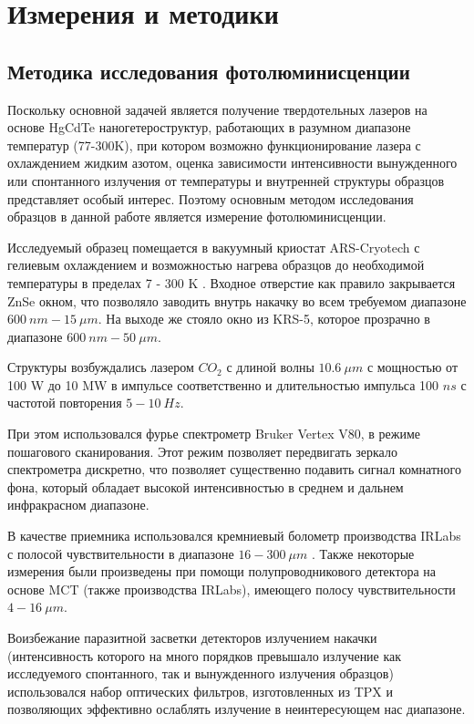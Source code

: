 \documentclass[../main.tex]{subfiles}
\begin{document}
    \chapter{Измерения и методики}

    
    \section{Методика исследования фотолюминисценции}
   
    Поскольку основной задачей является получение твердотельных лазеров 
    на основе HgCdTe наногетероструктур, работающих в разумном диапазоне температур (77-300K),
    при котором возможно функционирование лазера с охлаждением жидким азотом,
    оценка зависимости интенсивности вынужденного или спонтанного излучения от 
    температуры и внутренней структуры образцов представляет особый интерес. Поэтому
    основным методом исследования образцов в данной работе является измерение 
    фотолюминисценции.

    Исследуемый образец помещается в вакуумный криостат ARS-Cryotech с гелиевым охлаждением и
    возможностью нагрева образцов до необходимой температуры  в пределах 7 - 300 K . Входное 
    отверстие как правило закрывается ZnSe окном, что позволяло заводить внутрь накачку во всем 
    требуемом диапазоне $600~nm - 15~\mu m$. На выходе же стояло окно из KRS-5, которое прозрачно
    в диапазоне $600~nm-50~\mu m$.
    
    Структуры возбуждались лазером $CO_2$ с длиной волны $10.6~\mu m$ с мощностью от 100 W до 10 MW в импульсе соответственно
    и длительностью импульса 100 $ns$ с частотой повторения $5-10~Hz$.

    При этом использовался фурье спектрометр Bruker Vertex V80, в режиме пошагового сканирования. 
    Этот режим позволяет передвигать зеркало спектрометра дискретно, что позволяет существенно подавить сигнал комнатного фона,
    который обладает высокой интенсивностью в среднем и дальнем инфракрасном диапазоне.

    В качестве приемника использовался кремниевый болометр производства IRLabs с 
    полосой чувствительности в диапазоне $16 - 300 ~\mu m$ . Также некоторые измерения были произведены при помощи 
    полупроводникового детектора на основе MCT (также производства IRLabs), имеющего полосу чувствительности $4 - 16~\mu m$.

    Воизбежание паразитной засветки детекторов излучением накачки (интенсивность которого на много порядков 
    превышало излучение как исследуемого спонтанного, так и вынужденного излучения образцов) использовался набор оптических фильтров,
    изготовленных из TPX и  позволяющих эффективно ослаблять излучение в неинтересующем нас диапазоне.
    
\end{document}
